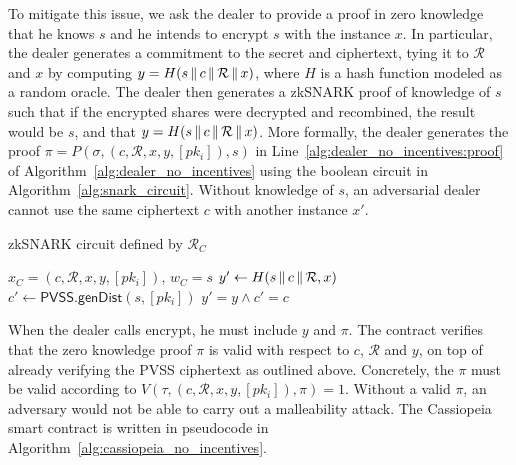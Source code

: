 To mitigate this issue, we ask the dealer to provide a proof in zero knowledge that he knows $s$ and he intends to encrypt $s$ with the instance $x$.
In particular, the dealer generates a commitment to the secret and ciphertext, tying it to $\mathcal{R}$ and $x$ by computing $y = H(s \,\|\, c \,\|\, \mathcal{R} \,\|\, x)$, where $H$ is a hash function modeled as a random oracle.
The dealer then generates a zkSNARK proof of knowledge of $s$ such that if the encrypted shares were decrypted and recombined, the result would be $s$, and that $y = H(s \,\|\, c \,\|\, \mathcal{R} \,\|\, x)$.
More formally, the dealer generates the proof $\pi = P(\sigma, (c, \mathcal{R}, x, y, [pk_i]), s)$ in Line~\ref{alg:dealer_no_incentives:proof} of Algorithm~\ref{alg:dealer_no_incentives} using the boolean circuit in Algorithm~\ref{alg:snark_circuit}.
Without knowledge of $s$, an adversarial dealer cannot use the same ciphertext $c$ with another instance $x'$.

\begin{algorithm}
    \caption{zkSNARK circuit defined by $\mathcal{R}_C$}
    \label{alg:snark_circuit}
    \begin{algorithmic}[1]
        \Require $x_C = (c, \mathcal{R}, x, y, [pk_i])$, $w_C = s$
        \State $y' \gets H(s \,\|\, c \,\|\, \mathcal{R}, x)$
        \State $c' \gets \textsf{PVSS.genDist}(s, [pk_i])$
        \State \Return $y' = y \land c' = c$
    \end{algorithmic}
\end{algorithm}

When the dealer calls \textsf{encrypt}, he must include $y$ and $\pi$.
The contract verifies that the zero knowledge proof $\pi$ is valid with respect to $c$, $\mathcal{R}$ and $y$, on top of already verifying the PVSS ciphertext as outlined above.
Concretely, the $\pi$ must be valid according to $V(\tau, (c, \mathcal{R}, x, y, [pk_i]), \pi) = 1$.
Without a valid $\pi$, an adversary would not be able to carry out a malleability attack.
The Cassiopeia smart contract is written in pseudocode in Algorithm~\ref{alg:cassiopeia_no_incentives}.

